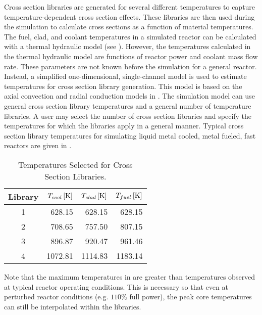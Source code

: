   Cross section libraries are generated for several different temperatures to
  capture temperature-dependent cross section effects. These libraries are then
  used during the simulation to calculate cross sections as a function of
  material temperatures. The fuel, clad, and coolant temperatures in a
  simulated reactor can be calculated with a thermal hydraulic model (see
  ). However, the temperatures calculated in the
  thermal hydraulic model are functions of reactor power and coolant mass flow
  rate. These parameters are not known before the simulation for a general
  reactor. Instead, a simplified one-dimensional, single-channel model is used
  to estimate temperatures for cross section library generation. This model is
  based on the axial convection and radial conduction models in
  . The simulation model can use general cross
  section library temperatures and a general number of temperature libraries.
  A user may select the number of cross section libraries and specify the
  temperatures for which the libraries apply in a general manner. Typical 
  cross section library temperatures for simulating liquid metal cooled, metal
  fueled, fast reactors are given in .

  \begin{table}
    \caption{Temperatures Selected for Cross Section Libraries.}
    \label{tab:xstemps}
    \begin{center}
      \begin{tabular}{crrr}
        \toprule
        Library & $T_{cool} \left[\text{{K}}\right]$ & $T_{clad} \left[\text{{K}}\right]$ & 
          $T_{fuel} \left[\text{{K}}\right]$ \\
        \midrule
        1 & 628.15 & 628.15 & 628.15  \\
        2 & 708.65 & 757.50 & 807.15  \\
        3 & 896.87 & 920.47 & 961.46 \\
        4 & 1072.81 & 1114.83 & 1183.14 \\
        \bottomrule
      \end{tabular}
    \end{center}
  \end{table}

  Note that the maximum temperatures in  are greater than 
  temperatures observed at typical reactor operating conditions. This is
  necessary so that even at perturbed reactor conditions (e.g. $110\%$ full
  power), the peak core temperatures can still be interpolated within the
  libraries.

